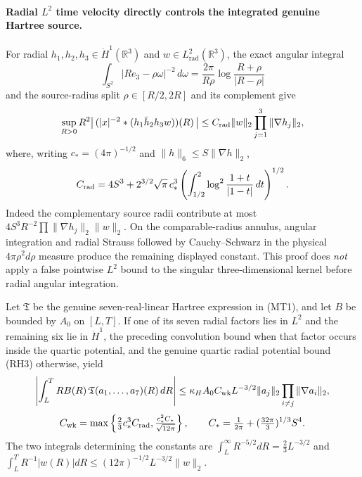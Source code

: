 \paragraph{Radial \(L^2\) time velocity directly controls the integrated genuine Hartree source.}
For radial \(h_1,h_2,h_3\in\dot H^1(\mathbb R^3)\) and
\(w\in L^2_{\mathrm{rad}}(\mathbb R^3)\), the exact angular integral
\[
 \int_{S^2}|Re_3-\rho\omega|^{-2}\,d\omega
 =\frac{2\pi}{R\rho}\log\frac{R+\rho}{|R-\rho|}
\]
and the source-radius split \(\rho\in[R/2,2R]\) and its complement give
\[
 \sup_{R>0} R^2
 \bigl|\,(|x|^{-2}*(h_1\bar h_2h_3w))(R)\,\bigr|
 \le C_{\rm rad}\|w\|_2\prod_{j=1}^3\|\nabla h_j\|_2,
\]
where, writing \(c_*=(4\pi)^{-1/2}\) and
\(\|h\|_6\le S\|\nabla h\|_2\),
\[
 C_{\rm rad}=4S^3+2^{3/2}\sqrt\pi\,c_*^3
 \left(\int_{1/2}^2
  \log^2\frac{1+t}{|1-t|}\,dt\right)^{1/2}.
\]
Indeed the complementary source radii contribute at most
\(4S^3R^{-2}\prod\|\nabla h_j\|_2\|w\|_2\).
On the comparable-radius annulus, angular integration and radial Strauss
followed by Cauchy--Schwarz in the physical \(4\pi\rho^2d\rho\) measure
produce the remaining displayed constant. This proof does \emph{not}
apply a false pointwise \(L^2\) bound to the singular three-dimensional
kernel before radial angular integration.

Let \(\mathfrak T\) be the genuine seven-real-linear Hartree expression
in (MT1), and let \(B\) be bounded by \(A_0\) on \([L,T]\).
If one of its seven radial factors lies in \(L^2\) and the remaining
six lie in \(\dot H^1\), the preceding convolution bound when that
factor occurs inside the quartic potential, and the genuine quartic
radial potential bound (RH3) otherwise, yield
\[
 \left|\int_L^T R B(R)\,\mathfrak T(a_1,\ldots,a_7)(R)\,dR\right|
 \le\kappa_H A_0 C_{\rm wk}L^{-3/2}
     \|a_j\|_2\prod_{i\ne j}\|\nabla a_i\|_2,
\]
\[
 C_{\rm wk}=\max\left\{
       \tfrac23c_*^3C_{\rm rad},
       \tfrac{c_*^2C_*}{\sqrt{12\pi}}\right\},
 \qquad
 C_*=\tfrac1{2\pi}
      +(\tfrac{32\pi}{3})^{1/3}S^4.
\]
The two integrals determining the constants are
\(\int_L^\infty R^{-5/2}dR=\tfrac23L^{-3/2}\)
and
\(\int_L^T R^{-1}|w(R)|dR
 \le(12\pi)^{-1/2}L^{-3/2}\|w\|_2\).

